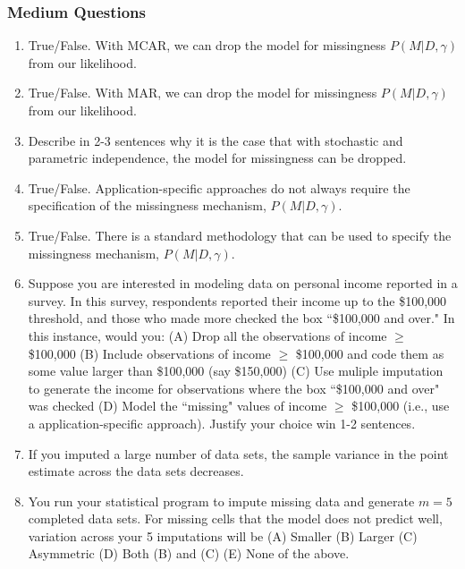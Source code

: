 \documentclass[11pt]{article}
\begin{document}
\subsubsection{Medium Questions}
\begin{enumerate}
\item True/False. With MCAR, we can drop the model for missingness $P(M|D,\gamma)$ from our likelihood.
\item True/False. With MAR, we can drop the model for missingness $P(M|D,\gamma)$ from our likelihood.
\item Describe in 2-3 sentences why it is the case that with stochastic and parametric independence, the model for missingness can be dropped.
\item True/False. Application-specific approaches do not always require the specification of the missingness mechanism, $P(M|D,\gamma)$.
\item True/False. There is a standard methodology that can be used to specify the missingness mechanism, $P(M|D,\gamma)$.
\item Suppose you are interested in modeling data on personal income reported in a survey. In this survey, respondents reported their income up to the \$100,000 threshold, and those who made more checked the box ``\$100,000 and over." In this instance, would you: (A) Drop all the observations of income $\geq$ \$100,000 (B) Include observations of income $\geq$ \$100,000 and code them as some value larger than \$100,000 (say \$150,000) (C) Use muliple imputation to generate the income for observations where the box ``\$100,000 and over" was checked (D) Model the ``missing" values of income $\geq$ \$100,000 (i.e., use a application-specific approach). Justify your choice win 1-2 sentences.
\item If you imputed a large number of data sets, the sample variance in the point estimate across the data sets decreases. %
\item You run your statistical program to impute missing data and generate $m=5$ completed data sets. For missing cells that the model does not predict well, variation across your 5 imputations will be (A) Smaller (B) Larger (C) Asymmetric (D) Both (B) and (C) (E) None of the above.
\end{enumerate}
\end{document}
